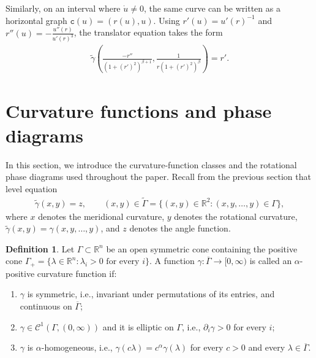 \documentclass{amsart}
\theoremstyle{plain}
\theoremstyle{mainintrothm}
\theoremstyle{definition}
\newtheorem{definition}[theorem]{Definition}
\begin{document}
\medskip

Similarly, on an interval where $\dot u\ne0$, the same curve can be written as a
horizontal graph $\mathtt c(u)=(r(u),u)$.  Using
$r'(u)=u'(r)^{-1}$ and
$r''(u)=-\frac{u''(r)}{u'(r)^3}$, the translator equation takes the form
\begin{align}
	\label{eq:horizontal-graph-translator}
	\widetilde\gamma
	\left(
	\frac{-r''}{(1+(r')^2)^{\beta+1}},
	\frac{1}{r(1+(r')^2)^\beta}
	\right)
	=
	r'.
\end{align}

\section{Curvature functions and phase diagrams}
\label{sec:curvature-functions-branches}

In this section, we introduce the curvature-function classes and the rotational
phase diagrams used throughout the paper.  Recall from the previous section that
level equation
\begin{align}
	\label{sec3:level-set-equation}
	\widetilde\gamma(x,y)=z,
	\qquad
	(x,y)\in\widetilde\Gamma
	=
	\{(x,y)\in\mathbb R^2:(x,y,\ldots,y)\in\Gamma\},
\end{align}
where $x$ denotes the meridional curvature, $y$ denotes the rotational
curvature,  $\widetilde\gamma(x,y)=\gamma(x,y,\ldots,y)$, and $z$ denotes the angle function.

\begin{definition}
	\label{def:alpha-positive-curvature-function}
	Let $\Gamma\subset\mathbb R^n$ be an open symmetric cone containing the
	positive cone
	$\Gamma_+=\{\lambda\in\mathbb R^n:\lambda_i>0\text{ for every }i\}$.
	A function $\gamma:\overline\Gamma\to[0,\infty)$ is called an
	$\alpha$-positive curvature function if:
	\begin{enumerate}[label=\textup{(\alph*)}]
		\item $\gamma$ is symmetric, i.e., invariant under permutations of its
		entries, and continuous on $\overline\Gamma$;
		\item $\gamma\in\mathcal C^1(\Gamma,(0,\infty))$ and it is elliptic on
		$\Gamma$, i.e., $\partial_i\gamma>0$ for every $i$;
		\item $\gamma$ is $\alpha$-homogeneous, i.e.,
		$\gamma(c\lambda)=c^\alpha\gamma(\lambda)$ for every $c>0$ and every
		$\lambda\in\overline\Gamma$.
	\end{enumerate}
\end{definition}
\end{document}

